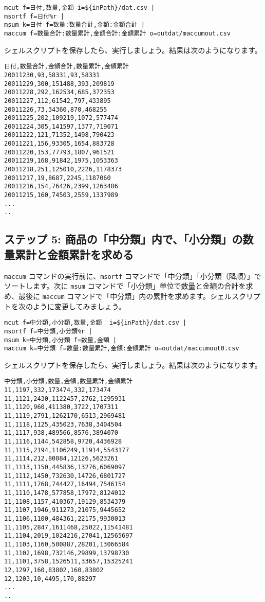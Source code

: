 \begin{verbatim}
mcut f=日付,数量,金額 i=${inPath}/dat.csv |
msortf f=日付%r |   
msum k=日付 f=数量:数量合計,金額:金額合計 |   
maccum f=数量合計:数量累計,金額合計:金額累計 o=outdat/maccumout.csv
\end{verbatim}

シェルスクリプトを保存したら、実行しましょう。結果は次のようになります。

\begin{verbatim}
日付,数量合計,金額合計,数量累計,金額累計
20011230,93,58331,93,58331
20011229,300,151488,393,209819
20011228,292,162534,685,372353
20011227,112,61542,797,433895
20011226,73,34360,870,468255
20011225,202,109219,1072,577474
20011224,305,141597,1377,719071
20011222,121,71352,1498,790423
20011221,156,93305,1654,883728
20011220,153,77793,1807,961521
20011219,168,91842,1975,1053363
20011218,251,125010,2226,1178373
20011217,19,8687,2245,1187060
20011216,154,76426,2399,1263486
20011215,160,74503,2559,1337989
...
..
\end{verbatim}

\subsection{ステップ 5: 商品の「中分類」内で、「小分類」の数量累計と金額累計を求める}

\verb|maccum| コマンドの実行前に、\verb|msortf| コマンドで「中分類」「小分類（降順）」でソートします。次に \verb|msum| コマンドで「小分類」単位で数量と金額の合計を求め、最後に \verb|maccum| コマンドで「中分類」内の累計を求めます。シェルスクリプトを次のように変更してみましょう。

\begin{verbatim}
mcut f=中分類,小分類,数量,金額  i=${inPath}/dat.csv |
msortf f=中分類,小分類%r |   
msum k=中分類,小分類 f=数量,金額 |   
maccum k=中分類 f=数量:数量累計,金額:金額累計 o=outdat/maccumout0.csv
\end{verbatim}

シェルスクリプトを保存したら、実行しましょう。結果は次のようになります。

\begin{verbatim}
中分類,小分類,数量,金額,数量累計,金額累計
11,1197,332,173474,332,173474
11,1121,2430,1122457,2762,1295931
11,1120,960,411380,3722,1707311
11,1119,2791,1262170,6513,2969481
11,1118,1125,435023,7638,3404504
11,1117,938,489566,8576,3894070
11,1116,1144,542858,9720,4436928
11,1115,2194,1106249,11914,5543177
11,1114,212,80084,12126,5623261
11,1113,1150,445836,13276,6069097
11,1112,1450,732630,14726,6801727
11,1111,1768,744427,16494,7546154
11,1110,1478,577858,17972,8124012
11,1108,1157,410367,19129,8534379
11,1107,1946,911273,21075,9445652
11,1106,1100,484361,22175,9930013
11,1105,2847,1611468,25022,11541481
11,1104,2019,1024216,27041,12565697
11,1103,1160,500887,28201,13066584
11,1102,1698,732146,29899,13798730
11,1101,3758,1526511,33657,15325241
12,1297,160,83802,160,83802
12,1203,10,4495,170,88297
...
..
\end{verbatim}

